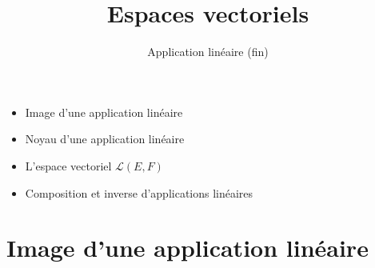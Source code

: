 






\title{{\bf Espaces vectoriels}}
\subtitle{Application linéaire (fin)}

\begin{frame}
  
  \debutmontitre

  \pause

{\footnotesize
\hfill
{}
\begin{minipage}{0.6\textwidth}
  \begin{itemize}
    \item<3-> Image d'une application linéaire
    \item<4-> Noyau d'une application linéaire
    \item<5-> L'espace vectoriel $\mathcal{L}(E,F)$
    \item<6-> Composition et inverse d'applications linéaires    
  \end{itemize}
\end{minipage}
}

\end{frame}

\setcounter{framenumber}{0}


\section{Image d'une application linéaire}

